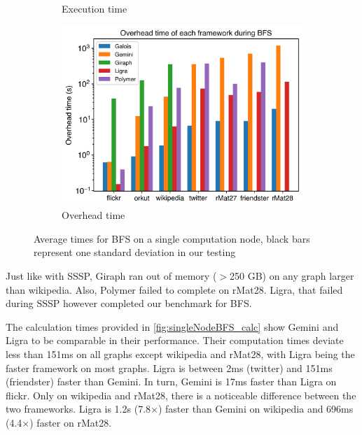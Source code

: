\begin{figure}
\begin{subfigure}{0.32\textwidth}
		\caption{Execution time}
		\label{fig:singleNodeBFS_exec}
	\end{subfigure}
	\hfil
	\begin{subfigure}{0.32\textwidth}
		\includegraphics[width=\linewidth]{../../plots/singleNodeBFS_overheadTime.png}
		\caption{Overhead time}
		\label{fig:singleNodeBFS_overheadNormalized}
	\end{subfigure}
	\caption{Average times for BFS on a single computation node, black bars represent one standard deviation in our testing}
\end{figure}
Just like with SSSP, Giraph ran out of memory ($>$250 GB) on any graph larger than wikipedia. Also, Polymer failed to complete on rMat28. Ligra, that failed during SSSP however completed our benchmark for BFS.

The calculation times provided in \autoref{fig:singleNodeBFS_calc} show Gemini and Ligra to be comparable in their performance. 
Their computation times deviate less than 151ms on all graphs except wikipedia and rMat28, with Ligra being the faster framework on most graphs.
Ligra is between 2ms (twitter) and 151ms (friendster) faster than Gemini.
In turn, Gemini is 17ms faster than Ligra on flickr.
Only on wikipedia and rMat28, there is a noticeable difference between the two frameworks. Ligra is 1.2s (7.8$\times$) faster than Gemini on wikipedia and 696ms (4.4$\times$) faster on rMat28.

